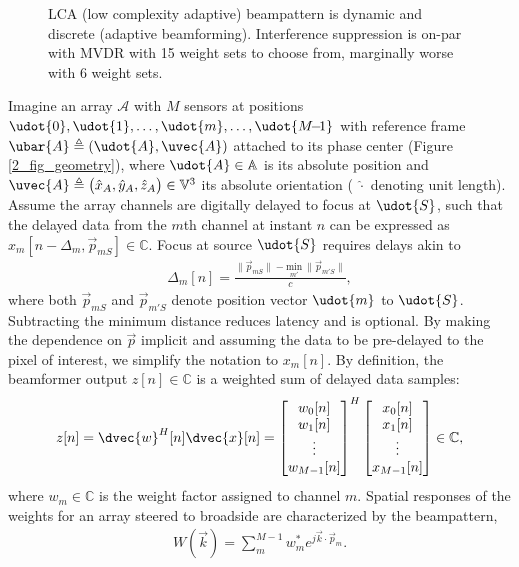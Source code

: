 {\begin{figure}[tp]
\caption{LCA (low complexity adaptive) beampattern is dynamic and discrete (adaptive beamforming). Interference suppression is on-par with MVDR with 15 weight sets to choose from, marginally worse with 6 weight sets.}%
\label{2_fig_scenario_lca}
\end{figure}

Imagine an array $\mathcal{A}$ with $M$ sensors at positions $\udot{0},\udot{1},\dots, \udot{m}, \dots, \udot{M{\!-\!1}}$ with reference frame $\ubar{A} \triangleq (\udot{A},\uvec{A})$ attached to its phase center (Figure \ref{2_fig_geometry}), where $\udot{A}\in\mathbb{A}$ is its absolute position and $\uvec{A}\triangleq\big(\hat{x}_{A},\hat{y}_{A},\hat{z}_{A}\big)\in\mathbb{V}^3$ its absolute orientation ( $\hat{\cdot}$ denoting unit length). Assume the array channels are digitally delayed to focus at $\udot{S}$, such that the delayed data from the $m$th channel at instant $n$ can be expressed as $x_m[n-\Delta_m, \vec{p}_{mS}]\in\mathbb{C}$. Focus at source $\udot{S}$ requires delays akin to
%
\begin{align}
\Delta_m[n] = \frac{\lVert \vec{p}_{mS}\rVert - \underset{m'}{\mathrm{min}}\ \lVert \vec{p}_{m'S}\rVert}{c},\label{2_eq_delta}
\end{align}
%
where both $\vec{p}_{mS}$ and $\vec{p}_{m'S}$ denote position vector $\udot{m}$ to $\udot{S}$. Subtracting the minimum distance reduces latency and is optional. By making the dependence on $\vec{p}$ implicit and assuming the data to be pre-delayed to the pixel of interest, we simplify the notation to $x_m[n]$. By definition, the beamformer output $z[n]\in\mathbb{C}$ is a weighted sum of delayed data samples:
%
\begin{align}
z[n] = \dvec{w}^H[n]\dvec{x}[n] = \bmat{w_0[n]\\w_1[n]\\\vdots\\w_{M-1}[n]}^H \bmat{x_0[n]\\x_1[n]\\\vdots\\x_{M-1}[n]} \in\mathbb{C},\label{2_eq_z}
\end{align}
%
where $w_m\in\mathbb{C}$ is the weight factor assigned to channel $m$. Spatial responses of the weights for an array steered to broadside are characterized by the beampattern,
%
\begin{align}
W(\vec{k}) = \sum_m^{M-1} w_m^* e^{j\vec k \cdot \vec{p}_m}.\label{2_eq_beampattern}

\end{align}}
